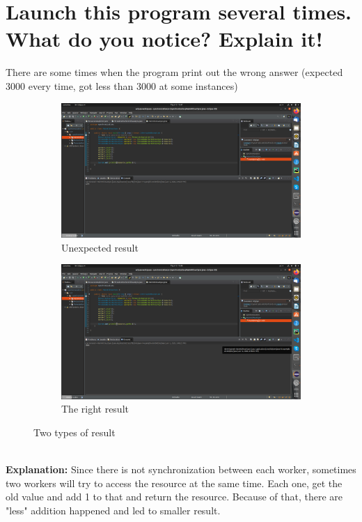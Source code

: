 \documentclass[11pt,a4paper]{report}
\begin{document}
\section{Launch this program several times. What do you notice? Explain it!}
There are some times when the program print out the wrong answer (expected 3000 every time, got less than 3000 at some instances)
\begin{figure}[h!]
	\centering
  	\begin{subfigure}[b]{0.4\linewidth}
  		\includegraphics[width=\linewidth]{less-3000.png}
    	\caption{Unexpected result}
  	\end{subfigure}
  	\begin{subfigure}[b]{0.4\linewidth}
    	\includegraphics[width=\linewidth]{exact-3000.png}
    	\caption{The right result}
  	\end{subfigure}
  	\caption{Two types of result}
  	\label{fig:wosync}
\end{figure}
\\\textbf{Explanation:} Since there is not synchronization between each worker, sometimes two workers will try to access the resource at the same time. Each one, get the old value and add 1 to that and return the resource. Because of that, there are "less" addition happened and led to smaller result.
\end{document}
